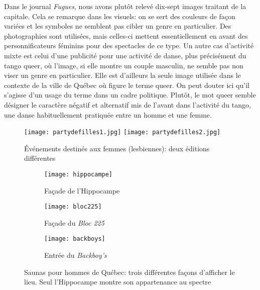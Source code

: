 Dans le journal \emph{Fugues}, nous avons plutôt relevé dix-sept images traitant de la capitale.
Cela se remarque dans les visuels: on se sert des couleurs de façon variées et les symboles ne semblent pas cibler un genre en particulier.
Des photographies sont utilisées, mais celles-ci mettent essentiellement en avant des personnificateurs féminins pour des spectacles de ce type.
Un autre cas d'activité mixte est celui d'une publicité pour une activité de danse, plus précisément du tango queer, où l'image, si elle montre un couple masculin, ne semble pas non viser un genre en particulier.
Elle est d'ailleurs la seule image utilisée dans le contexte de la ville de Québec où figure le terme queer.
On peut douter ici qu'il s'agisse d'un usage du terme dans un cadre politique.
Plutôt, le mot queer semble désigner le caractère négatif et alternatif mis de l'avant dans l'activité du tango, une danse habituellement pratiquée entre un homme et une femme.

\begin{figure}[ht]
  \centering
  {\texttt{[image: partydefilles1.jpg]}}
  {\texttt{[image: partydefilles2.jpg]}}
  \caption[Événements destinés aux femmes (lesbiennes)]{Événements destinés aux femmes (lesbiennes): deux éditions différentes}\label{figs:partydefilles}
\end{figure}

\begin{figure}[ht]
  \centering
  \begin{subfigure}[b]{.45\linewidth}
    \texttt{[image: hippocampe]}
    \caption{Façade de l'Hippocampe\label{fig:hippocampe}}
  \end{subfigure}

  \begin{subfigure}[b]{.45\linewidth}
    \texttt{[image: bloc225]}
    \caption{Façade du \emph{Bloc 225}\label{fig:bloc225}}
  \end{subfigure}
  \begin{subfigure}[b]{.45\linewidth}
    \texttt{[image: backboys]}
    \caption{Entrée du \emph{Backboy's}\label{fig:backboys}}
  \end{subfigure}
  \caption[Saunas pour hommes de Québec]{Saunas pour hommes de Québec: trois différentes façons d'afficher le lieu. Seul l'Hippocampe montre son appartenance au spectre \lgbt{}}\label{figs:saunas}
\end{figure}

